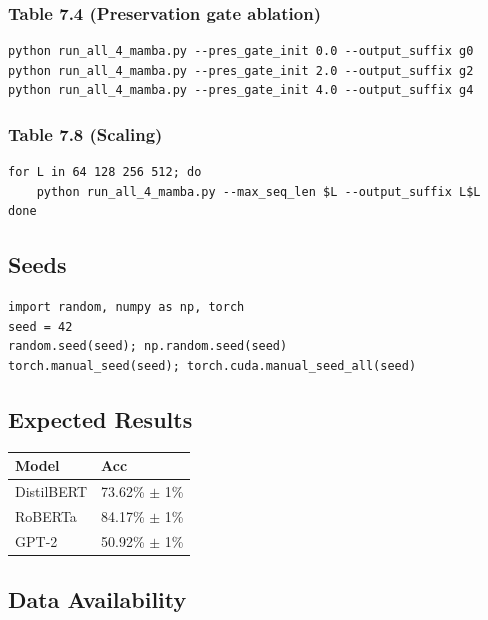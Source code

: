 \subsubsection{Table 7.4 (Preservation gate ablation)}
\begin{lstlisting}
python run_all_4_mamba.py --pres_gate_init 0.0 --output_suffix g0
python run_all_4_mamba.py --pres_gate_init 2.0 --output_suffix g2
python run_all_4_mamba.py --pres_gate_init 4.0 --output_suffix g4
\end{lstlisting}

\subsubsection{Table 7.8 (Scaling)}
\begin{lstlisting}
for L in 64 128 256 512; do
    python run_all_4_mamba.py --max_seq_len $L --output_suffix L$L
done
\end{lstlisting}

\subsection{Seeds}

\begin{lstlisting}
import random, numpy as np, torch
seed = 42
random.seed(seed); np.random.seed(seed)
torch.manual_seed(seed); torch.cuda.manual_seed_all(seed)
\end{lstlisting}

\subsection{Expected Results}

\begin{table}[H]
\centering
\small
\begin{tabular}{ll}
\toprule
\textbf{Model} & \textbf{Acc} \\
\midrule
DistilBERT & 73.62\% $\pm$ 1\% \\
RoBERTa & 84.17\% $\pm$ 1\% \\
GPT-2 & 50.92\% $\pm$ 1\% \\
\bottomrule
\end{tabular}
\end{table}

\subsection{Data Availability}

